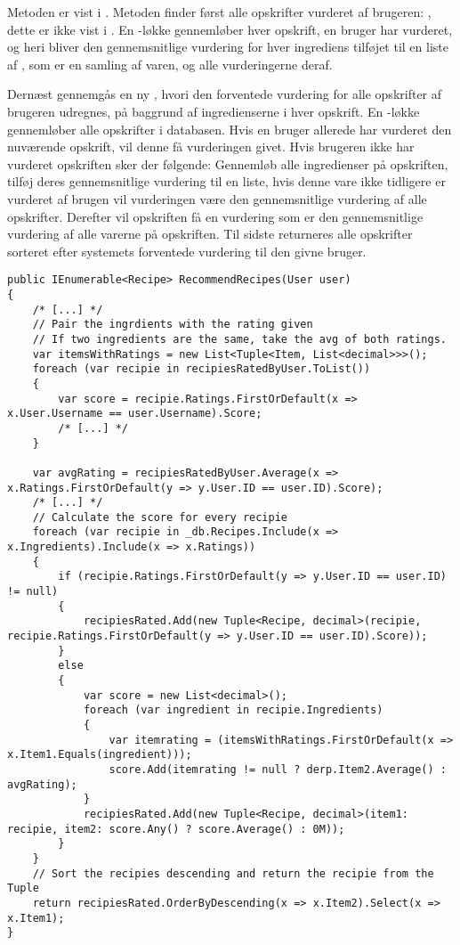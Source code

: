 Metoden  er vist i .
Metoden finder først alle opskrifter vurderet af brugeren: , dette er ikke vist i .
En -løkke gennemløber hver opskrift, en bruger har vurderet, og heri bliver den gennemsnitlige vurdering for hver ingrediens tilføjet til en liste af , som er en samling af varen, og alle vurderingerne deraf. 

Dernæst gennemgås en ny , hvori den forventede vurdering for alle opskrifter af brugeren udregnes, på baggrund af ingredienserne i hver opskrift.
En -løkke gennemløber alle opskrifter i databasen. 
Hvis en bruger allerede har vurderet den nuværende opskrift, vil denne få vurderingen givet.
Hvis brugeren ikke har vurderet opskriften sker der følgende: Gennemløb alle ingredienser på opskriften, tilføj deres gennemsnitlige vurdering til en liste, hvis denne vare ikke tidligere er vurderet af brugen vil vurderingen være den gennemsnitlige vurdering af alle opskrifter. 
Derefter vil opskriften få en vurdering som er den gennemsnitlige vurdering af alle varerne på opskriften.
Til sidste returneres alle opskrifter sorteret efter systemets forventede vurdering til den givne bruger.

\begin{lstlisting}[caption=Metoden \class{RecommendRecipes}. Sorterer opskrifter efter forventede vurdering for en given bruger., label=recommendrecipes]
public IEnumerable<Recipe> RecommendRecipes(User user)
{
    /* [...] */
    // Pair the ingrdients with the rating given
    // If two ingredients are the same, take the avg of both ratings.
    var itemsWithRatings = new List<Tuple<Item, List<decimal>>>();
    foreach (var recipie in recipiesRatedByUser.ToList())
    {
        var score = recipie.Ratings.FirstOrDefault(x => x.User.Username == user.Username).Score;
        /* [...] */
    }

    var avgRating = recipiesRatedByUser.Average(x => x.Ratings.FirstOrDefault(y => y.User.ID == user.ID).Score);
    /* [...] */
    // Calculate the score for every recipie
    foreach (var recipie in _db.Recipes.Include(x => x.Ingredients).Include(x => x.Ratings))
    {
        if (recipie.Ratings.FirstOrDefault(y => y.User.ID == user.ID) != null)
        {
            recipiesRated.Add(new Tuple<Recipe, decimal>(recipie, recipie.Ratings.FirstOrDefault(y => y.User.ID == user.ID).Score));
        }
        else
        {
            var score = new List<decimal>();
            foreach (var ingredient in recipie.Ingredients)
            {
                var itemrating = (itemsWithRatings.FirstOrDefault(x => x.Item1.Equals(ingredient)));
                score.Add(itemrating != null ? derp.Item2.Average() : avgRating);
            }
            recipiesRated.Add(new Tuple<Recipe, decimal>(item1: recipie, item2: score.Any() ? score.Average() : 0M));
        }
    }
    // Sort the recipies descending and return the recipie from the Tuple
    return recipiesRated.OrderByDescending(x => x.Item2).Select(x => x.Item1);
}
\end{lstlisting}

